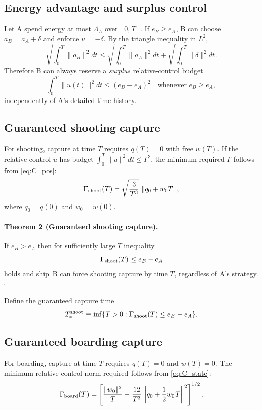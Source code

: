 \documentclass[journal, a4paper]{IEEEtran}
\begin{document}
\subsection{Energy advantage and surplus control}
Let A spend energy at most $\Lambda_A$ over $[0,T]$. If $e_B\ge e_A$, B can choose $a_B=a_A+\delta$ and enforce $u=-\delta$.
By the triangle inequality in $L^2$,
\begin{equation}
\sqrt{\int_0^T\|a_B\|^2dt}\le
\sqrt{\int_0^T\|a_A\|^2dt}+\sqrt{\int_0^T\|\delta\|^2dt}.
\end{equation}
Therefore B can always reserve a \emph{surplus} relative-control budget
\begin{equation}
\int_0^T \|u(t)\|^2dt \le (e_B-e_A)^2
\quad\text{whenever }e_B\ge e_A,
\label{eq:surplus}
\end{equation}
independently of A's detailed time history.

\subsection{Guaranteed shooting capture}
For shooting, capture at time $T$ requires $q(T)=0$ with free $w(T)$.
If the relative control $u$ has budget $\int_0^T\|u\|^2dt\le \Gamma^2$, the minimum required $\Gamma$ follows from \eqref{eq:C_pos}:
\begin{equation}
\Gamma_{\rm shoot}(T)
=
\sqrt{\frac{3}{T^3}}\ \|q_0+w_0T\|,
\label{eq:Gamma_shoot}
\end{equation}
where $q_0=q(0)$ and $w_0=w(0)$.

\paragraph{Theorem 2 (Guaranteed shooting capture).}
If $e_B>e_A$ then for sufficiently large $T$ inequality
\begin{equation}
\Gamma_{\rm shoot}(T)\le e_B-e_A
\label{eq:shoot_guarantee}
\end{equation}
holds and ship~B can force shooting capture by time $T$, regardless of A's strategy.
\hfill$\square$

Define the guaranteed capture time
\begin{equation}
T_*^{\rm shoot}
\equiv
\inf\{T>0:\Gamma_{\rm shoot}(T)\le e_B-e_A\}.
\end{equation}

\subsection{Guaranteed boarding capture}
For boarding, capture at time $T$ requires $q(T)=0$ and $w(T)=0$.
The minimum relative-control norm required follows from \eqref{eq:C_state}:
\begin{equation}
\Gamma_{\rm board}(T)
=
\left[
\frac{\|w_0\|^2}{T}
+
\frac{12}{T^3}\left\|q_0+\frac12 w_0T\right\|^2
\right]^{1/2}.
\label{eq:Gamma_board}
\end{equation}
\end{document}
